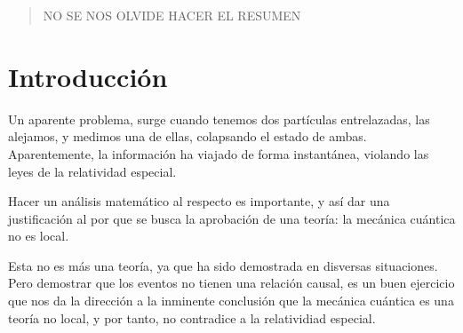 \begin{abstract}
    NO SE NOS OLVIDE HACER EL RESUMEN
\end{abstract}

\maketitle

\section{Introducción}

Un aparente problema, surge cuando tenemos dos partículas entrelazadas, las alejamos, y medimos una de ellas, colapsando el estado de ambas. 
Aparentemente, la información ha viajado de forma instantánea, violando las leyes de la relatividad especial. 

Hacer un análisis matemático al respecto es importante, y así dar una justificación al por que se busca la aprobación de una teoría: la mecánica cuántica no es local.

Esta no es más una teoría, ya que ha sido demostrada en disversas situaciones. Pero demostrar que los eventos no tienen una relación causal, es un buen ejercicio que nos da la dirección a la inminente conclusión que la mecánica cuántica es una teoría no local, y por tanto, no contradice a la relatividiad especial.

